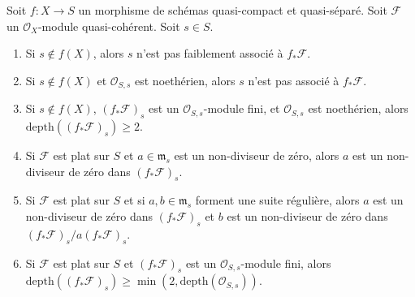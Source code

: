 \begin{lemma}
\label{lemma-depth-pushforward}
Soit  $f : X \to S$  un morphisme de schémas quasi-compact et quasi-séparé. Soit
 $\mathcal{F}$  un  $\mathcal{O}_X$-module quasi-cohérent. Soit  $s \in S$.
\begin{enumerate}
\item Si  $s \not \in f(X)$, alors  $s$  n'est pas faiblement associé à  $f_*\mathcal{F}$.
\item Si  $s \not \in f(X)$  et  $\mathcal{O}_{S, s}$  est noethérien, alors  $s$  n'est pas
associé à  $f_*\mathcal{F}$.
\item Si  $s \not \in f(X)$,  $(f_*\mathcal{F})_s$  est un  $\mathcal{O}_{S, s}$-module fini, et  $\mathcal{O}_{S, s}$  est
noethérien, alors  $\text{depth}((f_*\mathcal{F})_s) \geq 2$.
\item Si  $\mathcal{F}$  est plat sur  $S$  et  $a \in \mathfrak m_s$  est un non-diviseur de
zéro, alors  $a$  est un non-diviseur de zéro dans  $(f_*\mathcal{F})_s$.
\item Si  $\mathcal{F}$  est plat sur  $S$  et si  $a, b \in \mathfrak m_s$  forment une suite régulière,
alors  $a$  est un non-diviseur de zéro dans  $(f_*\mathcal{F})_s$  et  $b$ 
est un non-diviseur de zéro dans  $(f_*\mathcal{F})_s/a(f_*\mathcal{F})_s$.
\item Si  $\mathcal{F}$  est plat sur  $S$  et  $(f_*\mathcal{F})_s$  est un
 $\mathcal{O}_{S, s}$-module fini, alors  $\text{depth}((f_*\mathcal{F})_s) \geq
\min(2, \text{depth}(\mathcal{O}_{S, s}))$.
\end{enumerate}
\end{lemma}

